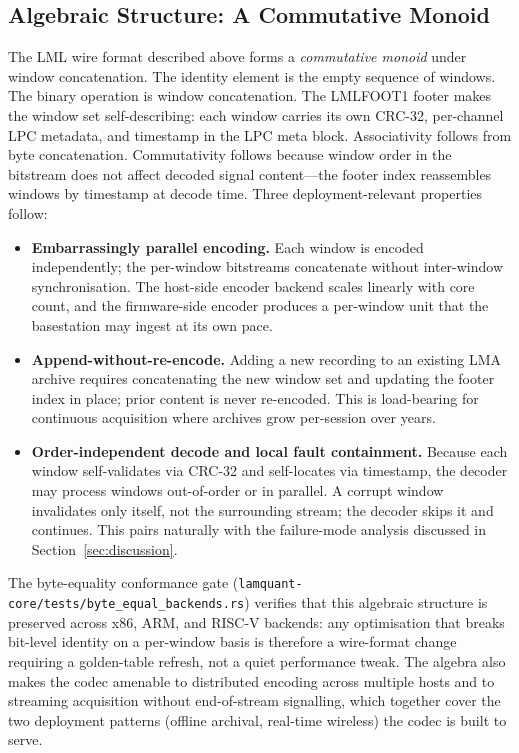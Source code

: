 \documentclass[journal]{IEEEtran}
\begin{document}
\subsection{Algebraic Structure: A Commutative Monoid}
\label{sec:monoid}
The LML wire format described above forms a \emph{commutative
monoid} under window concatenation. The identity element is the
empty sequence of windows. The binary operation is window
concatenation. The LMLFOOT1 footer makes the window set
self-describing: each window carries its own CRC-32, per-channel
LPC metadata, and timestamp in the LPC meta block. Associativity
follows from byte concatenation. Commutativity follows because
window order in the bitstream does not affect decoded signal
content---the footer index reassembles windows by timestamp at
decode time. Three deployment-relevant properties follow:
\begin{itemize}
\item \textbf{Embarrassingly parallel encoding.} Each window is
  encoded independently; the per-window bitstreams concatenate
  without inter-window synchronisation. The host-side encoder
  backend scales linearly with core count, and the firmware-side
  encoder produces a per-window unit that the basestation may
  ingest at its own pace.
\item \textbf{Append-without-re-encode.} Adding a new recording
  to an existing LMA archive requires concatenating the new
  window set and updating the footer index in place; prior content
  is never re-encoded. This is load-bearing for continuous
  acquisition where archives grow per-session over years.
\item \textbf{Order-independent decode and local fault containment.}
  Because each window self-validates via CRC-32 and self-locates via
  timestamp, the decoder may process windows out-of-order or in
  parallel. A corrupt window invalidates only itself, not the
  surrounding stream; the decoder skips it and continues. This
  pairs naturally with the failure-mode analysis discussed in
  Section~\ref{sec:discussion}.
\end{itemize}
The byte-equality conformance gate
(\texttt{lamquant-core/tests/byte\_equal\_backends.rs}) verifies
that this algebraic structure is preserved across x86, ARM, and
RISC-V backends: any optimisation that breaks bit-level identity
on a per-window basis is therefore a wire-format change requiring
a golden-table refresh, not a quiet performance tweak. The
algebra also makes the codec amenable to distributed encoding
across multiple hosts and to streaming acquisition without
end-of-stream signalling, which together cover the two
deployment patterns (offline archival, real-time wireless) the
codec is built to serve.
\end{document}
